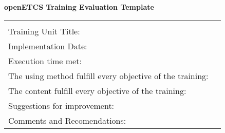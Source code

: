 \documentclass[a4paper, 11pt]{article}
\begin{document}
\begin{center} \huge\bf openETCS Training Evaluation Template\end{center}

\vspace{1\baselineskip}\vspace{-\parskip}

\begin{table}[H]
\begin{tabular}{|m{3.5cm}|m{8cm}|}
\hline
\rowcolor{myblue} \multicolumn{2}{|c|}{Training Evaluation Template} \\
Training Unit Title:& \\\hline
Implementation Date:& \\\hline
Execution time met:& \\\hline
The using method fulfill every objective of the training:& \\\hline
The content fulfill every objective of the training:& \\\hline
Suggestions for improvement:& \\\hline
Comments and Recomendations:& \\\hline
\end{tabular}
\end{table}
\end{document}
